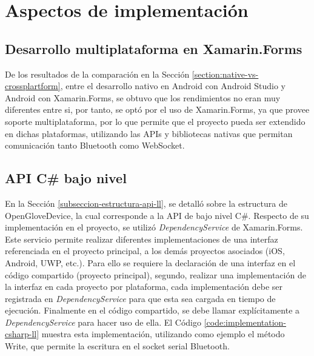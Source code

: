 \section{Aspectos de implementación}


\subsection{Desarrollo multiplataforma en Xamarin.Forms}
De los resultados de la comparación en la Sección \ref{section:native-vs-crossplartform}, entre el desarrollo nativo en Android con Android Studio y  Android con Xamarin.Forms, se obtuvo que los rendimientos no eran muy diferentes entre si, por tanto, se optó por el uso de Xamarin.Forms, ya que provee soporte multiplataforma, por lo que permite que el proyecto pueda ser extendido en dichas plataformas, utilizando las APIs y bibliotecas nativas que permitan comunicación tanto Bluetooth como WebSocket.




\subsection{API C\# bajo nivel}
En la Sección \ref{subseccion-estructura-api-ll}, se detalló sobre la estructura de OpenGloveDevice, la cual corresponde a la API de bajo nivel C\#. Respecto de su implementación en el proyecto, se utilizó \textit{DependencyService} de Xamarin.Forms. Este servicio permite realizar diferentes implementaciones de una interfaz referenciada en el proyecto principal, a los demás proyectos asociados (iOS, Android, UWP, etc.). Para ello se requiere la declaración de una interfaz en el código compartido (proyecto principal), segundo, realizar una implementación de la interfaz en cada proyecto por plataforma, cada implementación debe ser registrada en \textit{DependencyService} para que esta sea cargada en tiempo de ejecución. Finalmente en el código compartido, se debe llamar explícitamente a \textit{DependencyService} para hacer uso de ella. El Código \ref{code:implementation-csharp-ll} muestra esta implementación, utilizando como ejemplo el método Write, que permite la escritura en el socket serial Bluetooth.


